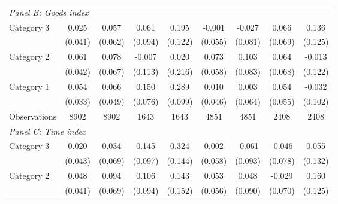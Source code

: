 {\begin{longtable}{l*{8}{c}}
\multicolumn{9}{l}{\textit{Panel B: Goods index}} \\

Category 3&    0.025         &    0.057         &    0.061         &    0.195         &   -0.001         &   -0.027         &    0.066         &    0.136         \\
                &  (0.041)         &  (0.062)         &  (0.094)         &  (0.122)         &  (0.055)         &  (0.081)         &  (0.069)         &  (0.125)         \\

Category 2&    0.061         &    0.078         &   -0.007         &    0.020         &    0.073         &    0.103         &    0.064         &   -0.013         \\
                &  (0.042)         &  (0.067)         &  (0.113)         &  (0.216)         &  (0.058)         &  (0.083)         &  (0.068)         &  (0.122)         \\

Category 1&    0.054         &    0.066         &    0.150\sym{**} &    0.289\sym{***}&    0.010         &    0.003         &    0.054         &   -0.032         \\
                &  (0.033)         &  (0.049)         &  (0.076)         &  (0.099)         &  (0.046)         &  (0.064)         &  (0.055)         &  (0.102)         \\

\midrule
Observations    &     8902         &     8902         &     1643         &     1643         &     4851         &     4851         &     2408         &     2408         \\



\midrule

\multicolumn{9}{l}{\textit{Panel C: Time index}} \\

Category 3&    0.020         &    0.034         &    0.145         &    0.324\sym{**} &    0.002         &   -0.061         &   -0.046         &    0.055         \\
                &  (0.043)         &  (0.069)         &  (0.097)         &  (0.144)         &  (0.058)         &  (0.093)         &  (0.078)         &  (0.132)         \\

Category 2&    0.048         &    0.094         &    0.106         &    0.143         &    0.053         &    0.048         &   -0.029         &    0.160         \\
                &  (0.041)         &  (0.069)         &  (0.094)         &  (0.152)         &  (0.056)         &  (0.090)         &  (0.070)         &  (0.125)         \\


\end{longtable}}
